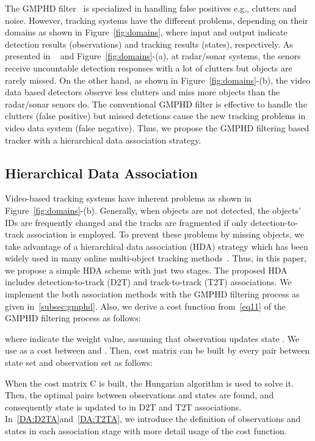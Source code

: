 \documentclass[journal]{IEEEtran}
\newcounter{ct}
\begin{document}
The GMPHD filter~\cite{gmphd} is specialized in handling false positives e.g., clutters and noise.
However, tracking systems have the different problems, depending on their domains as shown in Figure~\ref{fig:domains}, where input and output indicate detection results (observations) and tracking results (states), respectively.
As presented in ~\cite{Vo_thesis} and Figure~\ref{fig:domains}-(a), at radar/sonar systems, the senors receive uncountable detection responses with a lot of clutters but objects are rarely missed. On the other hand, as shown in Figure~\ref{fig:domains}-(b), the video data based detectors observe less clutters and miss more objects than the radar/sonar senors do.
The conventional GMPHD filter is effective to handle the clutters (false positive) but missed detctions cause the new tracking problems in video data system (false negative).
Thus, we propose the GMPHD filtering based tracker with a hierarchical data association strategy. 

\subsection{Hierarchical Data Association}
\label{hda}
Video-based tracking systems have inherent problems as shown in Figure~\ref{fig:domains}-(b). 
Generally, when objects are not detected, the objects' IDs are frequently changed and the tracks are fragmented if only detection-to-track association is employed. 
To prevent these problems by missing objects, we take advantage of a hierarchical data association (HDA) strategy which has been widely used in many online multi-object tracking methods~\cite{bae1,bae2,prev1,prev2,eamtt}. Thus, in this paper, we propose a simple HDA scheme with just two stages. 
The proposed HDA includes detection-to-track (D2T) and track-to-track (T2T) associations.
We implement the both association methods with the GMPHD filtering process as given in~\ref{subsec:gmphd}.
Also, we derive a cost function from~\eqref{eq11} of the GMPHD filtering process as follows:

where  indicate the weight value, assuming that observation  updates state . We use  as a cost between  and .
Then, cost matrix  can be built by every pair between state set  and observation set  as follows:

When the cost matrix C is built, the Hungarian algorithm is used to solve it. 
Then, the optimal pairs between observations and states are found, and consequently state  is updated to  in D2T and T2T associations.
In~\ref{DA:D2TA}and~\ref{DA:T2TA}, we introduce the definition of observations and states in each association stage with more detail usage of the cost function.
\end{document}
